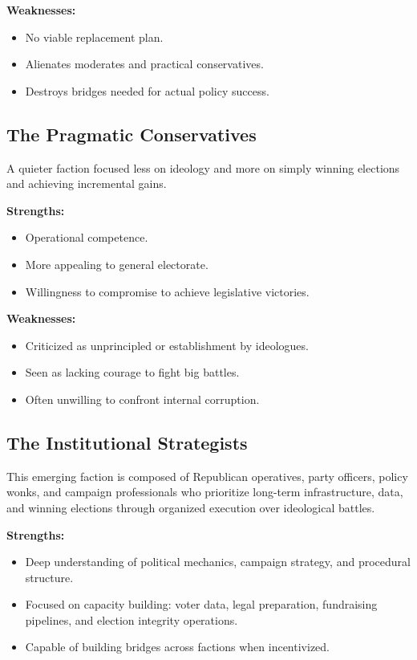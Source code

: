 \textbf{Weaknesses:}
\begin{itemize}
\item No viable replacement plan.
\item Alienates moderates and practical conservatives.
\item Destroys bridges needed for actual policy success.
\end{itemize}

\subsection{The Pragmatic Conservatives}
A quieter faction focused less on ideology and more on simply winning elections and achieving incremental gains.

\textbf{Strengths:}
\begin{itemize}
\item Operational competence.
\item More appealing to general electorate.
\item Willingness to compromise to achieve legislative victories.
\end{itemize}

\textbf{Weaknesses:}
\begin{itemize}
\item Criticized as unprincipled or establishment by ideologues.
\item Seen as lacking courage to fight big battles.
\item Often unwilling to confront internal corruption.
\end{itemize}

\subsection{The Institutional Strategists}
This emerging faction is composed of Republican operatives, party officers, policy wonks, and campaign professionals who prioritize long-term infrastructure, data, and winning elections through organized execution over ideological battles.

\textbf{Strengths:}
\begin{itemize}
\item Deep understanding of political mechanics, campaign strategy, and procedural structure.
\item Focused on capacity building: voter data, legal preparation, fundraising pipelines, and election integrity operations.
\item Capable of building bridges across factions when incentivized.
\end{itemize}

